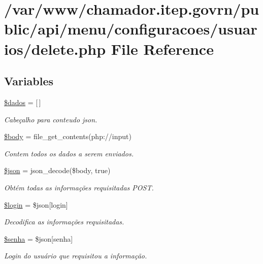 \hypertarget{usuarios_2delete_8php}{}\section{/var/www/chamador.itep.\+govrn/public/api/menu/configuracoes/usuarios/delete.php File Reference}
\label{usuarios_2delete_8php}
\subsection*{Variables}
\begin{DoxyCompactItemize}
\item 
\hyperlink{usuarios_2delete_8php_a252370d95039a38fa11afab784725d58}{\$dados} = \mbox{[}$\,$\mbox{]}
\begin{DoxyCompactList}\small\item\em Cabeçalho para conteudo json. \end{DoxyCompactList}\item 
\hyperlink{usuarios_2delete_8php_a26b9f9373f7bb79dfcf8a86dff086b45}{\$body} = file\+\_\+get\+\_\+contents(\textquotesingle{}php\+://input\textquotesingle{})
\begin{DoxyCompactList}\small\item\em Contem todos os dados a serem enviados. \end{DoxyCompactList}\item 
\hyperlink{usuarios_2delete_8php_acedd13b51401130848ce18f4d5c52605}{\$json} = json\+\_\+decode(\$body, true)
\begin{DoxyCompactList}\small\item\em Obtém todas as informações requisitadas P\+O\+ST. \end{DoxyCompactList}\item 
\hyperlink{usuarios_2delete_8php_afc31993e855f9631572adfedcfe6f34b}{\$login} = \$json\mbox{[}\textquotesingle{}login\textquotesingle{}\mbox{]}
\begin{DoxyCompactList}\small\item\em Decodifica as informações requisitadas. \end{DoxyCompactList}\item 
\hyperlink{usuarios_2delete_8php_a3678c8769c9698fd30581c1016c5f475}{\$senha} = \$json\mbox{[}\textquotesingle{}senha\textquotesingle{}\mbox{]}
\begin{DoxyCompactList}\small\item\em Login do usuário que requisitou a informação. \end{DoxyCompactList}\item 

\end{DoxyCompactItemize}
